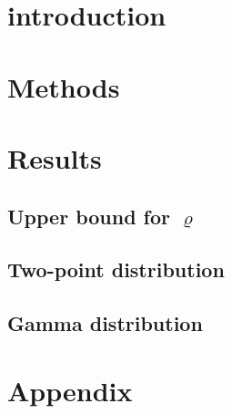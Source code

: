 \documentclass{scrartcl}
\begin{document}
\section{introduction}

  

\section{Methods}


  
  
\section{Results}

  \subsection*{Upper bound for $\varrho$}

    

  \subsection*{Two-point distribution}  

    

  \subsection*{Gamma distribution}

    

    \newpage
\clearpage     
\section{Appendix}

  



\printbibliography
  
  
\end{document}
